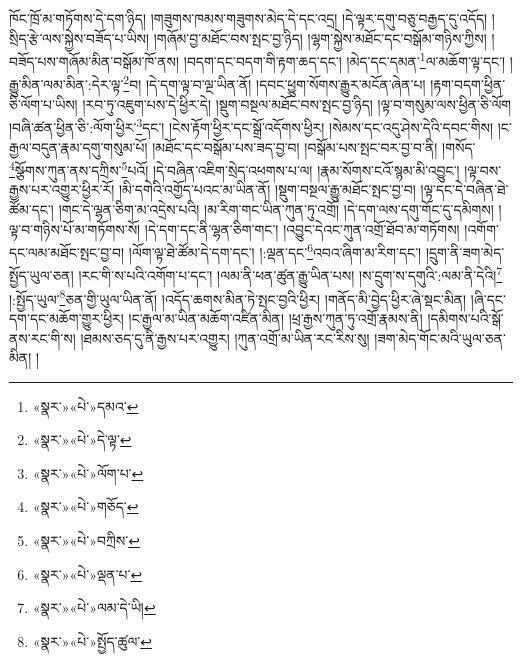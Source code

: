 ཁོང་ཁྲོ་མ་གཏོགས་དེ་དག་ཉིད། །གཟུགས་ཁམས་གཟུགས་མེད་དེ་དང་འདྲ། །དེ་ལྟར་དགུ་བཅུ་བརྒྱད་དུ་འདོད། །སྲིད་རྩེ་ལས་སྐྱེས་བཟོད་པ་ཡིས། །གཞོམ་བྱ་མཐོང་བས་སྤང་བྱ་ཉིད། །ལྷག་སྐྱེས་མཐོང་དང་བསྒོམ་གཉིས་ཀྱིས། །བཟོད་པས་གཞོམ་མིན་བསྒོམ་ཁོ་ནས། །བདག་དང་བདག་གི་རྟག་ཆད་དང་། །མེད་དང་དམན་\footnote{«སྣར་»«པེ་»དམའ་}ལ་མཆོག་ལྟ་དང་། །རྒྱུ་མིན་ལམ་མིན་:དེར་ལྟ་\footnote{«སྣར་»«པེ་»དེ་ལྟ་}བ། །དེ་དག་ལྟ་བ་ལྔ་ཡིན་ནོ། །དབང་ཕྱུག་སོགས་རྒྱུར་མངོན་ཞེན་པ། །རྟག་བདག་ཕྱིན་ཅི་ལོག་པ་ཡིས། །རབ་ཏུ་འཇུག་པས་དེ་ཕྱིར་དེ། །སྡུག་བསྔལ་མཐོང་བས་སྤང་བྱ་ཉིད། །ལྟ་བ་གསུམ་ལས་ཕྱིན་ཅི་ལོག །བཞི་ཚན་ཕྱིན་ཅི་:ལོག་ཕྱིར་\footnote{«སྣར་»«པེ་»ལོག་པ་}དང་། །ངེས་རྟོག་ཕྱིར་དང་སྒྲོ་འདོགས་ཕྱིར། །སེམས་དང་འདུ་ཤེས་དེའི་དབང་གིས། །ང་རྒྱལ་བདུན་རྣམ་དགུ་གསུམ་པོ། །མཐོང་དང་བསྒོམ་པས་ཟད་བྱ་བ། །བསྒོམ་པས་སྤང་བར་བྱ་བ་ནི། །གསོད་\footnote{«སྣར་»«པེ་»གཅོད་}སྩོགས་ཀུན་ནས་དཀྲིས་\footnote{«སྣར་»«པེ་»བཀྲིས་}པའོ། །དེ་བཞིན་འཇིག་སྲེད་འཕགས་པ་ལ། །རྣམ་སོགས་ངའོ་སྙམ་མི་འབྱུང་། །ལྟ་བས་རྒྱས་པར་འགྱུར་ཕྱིར་རོ། །མི་དགེའི་འགྱོད་པའང་མ་ཡིན་ནོ། །སྡུག་བསྔལ་རྒྱུ་མཐོང་སྤང་བྱ་བ། །ལྟ་དང་དེ་བཞིན་ཐེ་ཚོམ་དང་། །གང་དེ་ལྷན་ཅིག་མ་འདྲེས་པའི། །མ་རིག་གང་ཡིན་ཀུན་ཏུ་འགྲོ། །དེ་དག་ལས་དགུ་གོང་དུ་དམིགས། །ལྟ་བ་གཉིས་པོ་མ་གཏོགས་སོ། །དེ་དག་དང་ནི་ལྷན་ཅིག་གང་། །འབྱུང་དེའང་ཀུན་འགྲོ་ཐོབ་མ་གཏོགས། །འགོག་དང་ལམ་མཐོང་སྤང་བྱ་བ། །ལོག་ལྟ་ཐེ་ཚོམ་དེ་དག་དང་། །:ལྡན་དང་\footnote{«སྣར་»«པེ་»ལྡན་པ་}འབའ་ཞིག་མ་རིག་དང་། །དྲུག་ནི་ཟག་མེད་སྤྱོད་ཡུལ་ཅན། །རང་གི་ས་པའི་འགོག་པ་དང་། །ལམ་ནི་ཕན་ཚུན་རྒྱུ་ཡིན་པས། །ས་དྲུག་ས་དགུའི་:ལམ་ནི་དེའི།\footnote{«སྣར་»«པེ་»ལམ་དེ་ཡི།} །:སྤྱོད་ཡུལ་\footnote{«སྣར་»«པེ་»སྤྱོད་ཚུལ་}ཅན་གྱི་ཡུལ་ཡིན་ནོ། །འདོད་ཆགས་མིན་ཏེ་སྤང་བྱའི་ཕྱིར། །གནོད་མི་བྱེད་ཕྱིར་ཞེ་སྡང་མིན། །ཞི་དང་དག་དང་མཆོག་གྱུར་ཕྱིར། །ང་རྒྱལ་མ་ཡིན་མཆོག་འཛིན་མིན། །ཕྲ་རྒྱས་ཀུན་ཏུ་འགྲོ་རྣམས་ནི། །དམིགས་པའི་སྒོ་ནས་རང་གི་ས། །ཐམས་ཅད་དུ་ནི་རྒྱས་པར་འགྱུར། །ཀུན་འགྲོ་མ་ཡིན་རང་རིས་སུ། །ཟག་མེད་གོང་མའི་ཡུལ་ཅན་མིན། །
